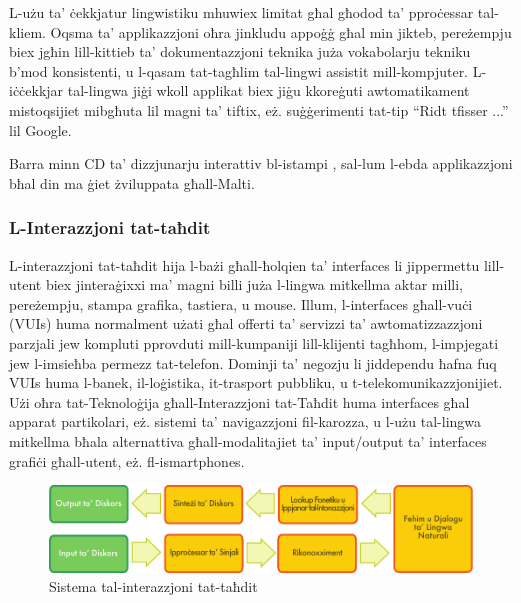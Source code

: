 \documentclass[]{../../metanetpaper}
\begin{document}
\begin{multicols}{2}
L-użu ta’ ċekkjatur lingwistiku mhuwiex limitat għal għodod ta’  pproċessar tal-kliem. Oqsma ta’ applikazzjoni oħra jinkludu appoġġ għal min jikteb, pereżempju biex jgħin lill-kittieb ta’ dokumentazzjoni teknika juża vokabolarju tekniku b’mod konsistenti, u l-qasam tat-tagħlim tal-lingwi assistit mill-kompjuter. L-iċċekkjar tal-lingwa jiġi wkoll applikat biex jiġu kkoreġuti awtomatikament mistoqsijiet mibgħuta lil magni ta’ tiftix, eż. suġġerimenti tat-tip ``Ridt tfisser ...'' lil Google. 

Barra minn CD ta’ dizzjunarju interattiv bl-istampi \cite{Sciriha:1997}, sal-lum l-ebda applikazzjoni bħal din ma ġiet żviluppata għall-Malti.

  
\subsubsection{L-Interazzjoni tat-taħdit }

L-interazzjoni tat-taħdit hija l-bażi għall-ħolqien ta’ interfaces li jippermettu lill-utent biex jinteraġixxi ma’ magni billi juża l-lingwa mitkellma aktar milli, pereżempju, stampa grafika, tastiera, u mouse. Illum, l-interfaces għall-vuċi (VUIs) huma normalment użati għal offerti ta’ servizzi ta’ awtomatizzazzjoni parzjali jew kompluti pprovduti mill-kumpaniji lill-klijenti tagħhom, l-impjegati jew l-imsieħba permezz tat-telefon. Dominji ta’ negozju li jiddependu ħafna fuq VUIs huma l-banek, il-loġistika, it-trasport pubbliku, u t-telekomunikazzjonijiet. Użi oħra tat-Teknoloġija għall-Interazzjoni tat-Taħdit huma interfaces għal apparat partikolari, eż. sistemi ta’ navigazzjoni fil-karozza, u l-użu tal-lingwa mitkellma bħala alternattiva għall-modalitajiet ta’ input/output ta’ interfaces grafiċi għall-utent, eż. fl-ismartphones.


\begin{figure}[htb]
  \center 
  \includegraphics[width=\textwidth]{../_media/maltese/simple_speech-based_dialogue_architecture}
  \caption{Sistema tal-interazzjoni tat-taħdit}
  \label{fig:dialoguearch_mt}
\end{figure}


\end{multicols}
\end{document}
